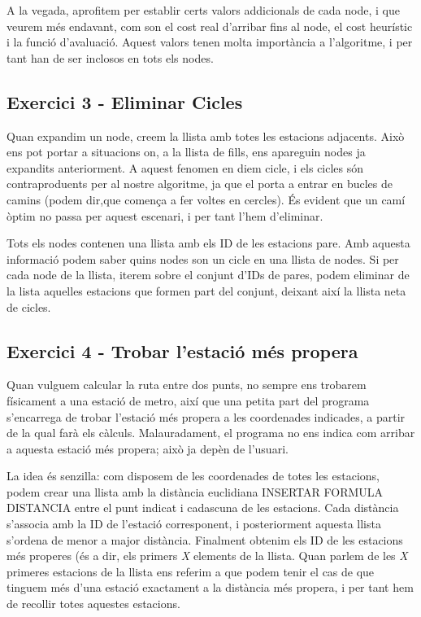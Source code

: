 \documentclass[a4paper,12pt]{article}
\begin{document}
            A la vegada, aprofitem per establir certs valors addicionals de cada node, i que veurem més endavant, com son el cost real d’arribar fins al node, el cost heurístic i la funció d'avaluació. Aquest valors tenen molta importància a l’algoritme, i per tant han de ser inclosos en tots els nodes.


        \subsection{Exercici 3 - Eliminar Cicles}

            Quan expandim un node, creem la llista amb totes les estacions adjacents. Això ens pot portar a situacions on, a la llista de fills, ens apareguin nodes ja expandits anteriorment. A aquest fenomen en diem cicle, i els cicles són contraproduents per al nostre algoritme, ja que el porta a entrar en bucles de camins (podem dir,que comença a fer voltes en cercles). És evident que un camí òptim no passa per aquest escenari, i per tant l’hem d’eliminar.

            Tots els nodes contenen una llista amb els ID de les estacions pare. Amb aquesta informació podem saber quins nodes son un cicle en una llista de nodes. Si per cada node de la llista, iterem sobre el conjunt d’IDs de pares, podem eliminar de la lista aquelles estacions que formen part del conjunt, deixant així la llista neta de cicles.


        \subsection{Exercici 4 - Trobar l’estació més propera}

            Quan vulguem calcular la ruta entre dos punts, no sempre ens trobarem físicament a una estació de metro, així que una petita part del programa s’encarrega de trobar l’estació més propera a les coordenades indicades, a partir de la qual farà els càlculs. Malauradament, el programa no ens indica com arribar a aquesta estació més propera; això ja depèn de l’usuari.

            La idea és senzilla: com disposem de les coordenades de totes les estacions, podem crear una llista amb la distància euclidiana INSERTAR FORMULA DISTANCIA entre el punt indicat i cadascuna de les estacions. Cada distància s’associa amb la ID de l’estació corresponent, i posteriorment aquesta llista s’ordena de menor a major distància. Finalment obtenim els ID de les estacions més properes (és a dir, els primers \textit{X} elements de la llista.
            Quan parlem de les \textit{X} primeres estacions de la llista ens referim a que podem tenir el cas de que tinguem més d’una estació exactament a la distància més propera, i per tant hem de recollir totes aquestes estacions.
            
\end{document}
